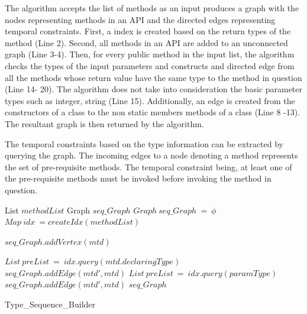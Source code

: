 The algorithm accepts the list of methods as an input produces a graph with
the nodes representing methods in an API and the directed edges representing temporal constraints.
First, a index is created based on the return types of the method (Line 2).
Second, all methods in an API are added to an unconnected graph (Line 3-4).
Then, for every public method in the input list, the algorithm checks the types
of the input parameters and constructs and directed edge from all the methods whose return value
have the same type to the method in question (Line 14- 20).
The algorithm does not take into consideration the basic parameter types such as integer, string (Line 15).
Additionally, an edge is created from the constructors of a class to the non static members methods of a class (Line 8 -13).
The resultant graph is then returned by the algorithm.


The temporal constraints based on the type information can be extracted by querying the graph. 
The incoming edges to a node denoting a method represents the set of pre-requisite methods.
The temporal constraint being, at least one of the pre-requisite methods must be invoked before invoking the method in question.


\begin{algorithm}[t!]
\begin{algorithmic}[1]
\begin{scriptsize}
\REQUIRE List $methodList$ 
\ENSURE Graph $seq\_Graph$
\STATE $Graph\ seq\_Graph\ =\ \phi$
\STATE $Map\ idx\ = createIdx(methodList)$

	\STATE $seq\_Graph.addVertex(mtd)$
\ENDFOR

			\STATE $List\ preList\ =\ idx.query(mtd.declaringType)$
				\STATE $seq\_Graph.addEdge(mtd',mtd)$
			\ENDFOR
		\ENDIF
				\STATE $List\ preList\ =\ idx.query(paramType)$
					\STATE $seq\_Graph.addEdge(mtd',mtd)$
				\ENDFOR				
			\ENDIF
		\ENDFOR
	\ENDIF
\ENDFOR
\RETURN $seq\_Graph$
\end{scriptsize}
\end{algorithmic}
\caption{Type\_Sequence\_Builder}
\label{alg:TypeAnalysis}
\end{algorithm} 

